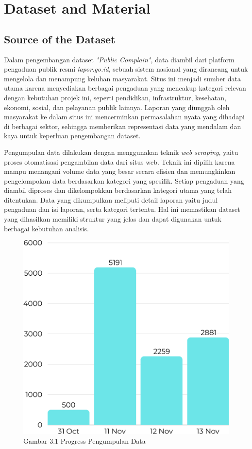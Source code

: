 \documentclass[12pt,a4paper]{article}
\begin{document}
\section{Dataset and Material}

\subsection{Source of the Dataset}
\begin{adjustwidth}{3em}{0pt} 
\hspace{0.5cm} Dalam pengembangan dataset\textit{ "Public Complain",} data diambil dari platform pengaduan publik resmi \textit{lapor.go.id}, sebuah sistem nasional yang dirancang untuk mengelola dan menampung keluhan masyarakat. Situs ini menjadi sumber data utama karena menyediakan berbagai pengaduan yang mencakup kategori relevan dengan kebutuhan projek ini, seperti pendidikan, infrastruktur, kesehatan, ekonomi, sosial, dan pelayanan publik lainnya. Laporan yang diunggah oleh masyarakat ke dalam situs ini mencerminkan permasalahan nyata yang dihadapi di berbagai sektor, sehingga memberikan representasi data yang mendalam dan kaya untuk keperluan pengembangan dataset.

\hspace{0.5cm} 
Pengumpulan data dilakukan dengan menggunakan teknik \textit{web scraping}, yaitu proses otomatisasi pengambilan data dari situs web. Teknik ini dipilih karena mampu menangani volume data yang besar secara efisien dan memungkinkan pengelompokan data berdasarkan kategori yang spesifik. Setiap pengaduan yang diambil diproses dan dikelompokkan berdasarkan kategori utama yang telah ditentukan. Data yang dikumpulkan meliputi detail laporan yaitu judul pengaduan dan isi laporan, serta kategori tertentu. Hal ini memastikan dataset yang dihasilkan memiliki struktur yang jelas dan dapat digunakan untuk berbagai kebutuhan analisis.\end{adjustwidth}

\begin{figure} %
    \centering
    \includegraphics[width=0.5\linewidth]{Image/progress pengumpulan data.png}
    \caption{Gambar 3.1 Progress Pengumpulan Data}
    \label{fig:roc_auc}
\end{figure}  
\end{document}
